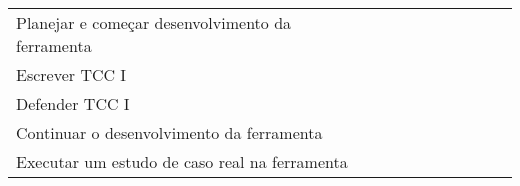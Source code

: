 \begin{table}[!htb]
{\begin{tabular}{p{4cm}|l|lllll|lll}
      Planejar e começar desenvolvimento da ferramenta                                                                                 &                                      &                                      & {\cellcolor[rgb]{0.753,0.753,0.753}} & {\cellcolor[rgb]{0.753,0.753,0.753}} &                                      &                                      &                                      &                                      &                                      \\
      \rowcolor[rgb]{0.914,0.914,0.914} Escrever TCC I                                                                                 &                                      &                                      &                                      & {\cellcolor[rgb]{0.753,0.753,0.753}} & {\cellcolor[rgb]{0.753,0.753,0.753}} & {\cellcolor[rgb]{0.753,0.753,0.753}} &                                      &                                      &                                      \\
      Defender TCC I                                                                                                                   &                                      &                                      &                                      &                                      &                                      & {\cellcolor[rgb]{0.753,0.753,0.753}} &                                      &                                      &                                      \\
      \rowcolor[rgb]{0.914,0.914,0.914} Continuar o desenvolvimento da ferramenta                                                      &                                      &                                      &                                      &                                      &                                      & {\cellcolor[rgb]{0.753,0.753,0.753}} & {\cellcolor[rgb]{0.753,0.753,0.753}} & {\cellcolor[rgb]{0.753,0.753,0.753}} &                                      \\
      Executar um estudo de caso real na ferramenta                                                                                    &                                      &                                      &                                      &                                      &                                      &                                      &                                      & {\cellcolor[rgb]{0.753,0.753,0.753}} &                                      \\

\end{tabular}}
\end{table}
